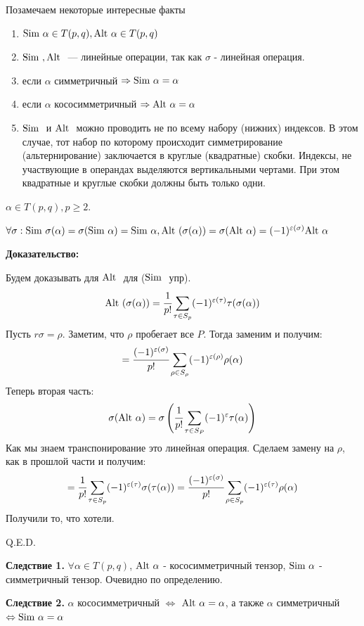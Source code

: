 Позамечаем некоторые интересные факты 
\begin{enumerate}
    \item $\text{Sim } \alpha \in T(p,q), \text{Alt } \alpha \in T(p,q) $ 
    \item $\text{Sim }, \text{Alt }$ --- линейные операции, так как $\sigma$ - линейная операция.
    \item если $\alpha$ симметричный $\Rightarrow \text{Sim } \alpha = \alpha$
    \item  если $\alpha$ кососимметричный $\Rightarrow \text{Alt } \alpha = \alpha$
    \item $\text{Sim }$ и $\text{Alt }$ можно проводить не по всему набору (нижних) индексов. В этом случае, тот набор по которому происходит симметрирование (альтернирование) заключается в круглые (квадратные) скобки. Индексы, не участвующие в операндах выделяются вертикальными чертами. При этом квадратные и круглые скобки должны быть только одни.

\end{enumerate}


$\alpha \in T(p,q), p \geq 2.$ 

$\forall \sigma: \text{Sim } \sigma(\alpha) = \sigma(\text{Sim } \alpha) = \text{Sim } \alpha, \text{Alt }(\sigma(\alpha)) = \sigma(\text{Alt }\alpha) = (-1)^{\varepsilon(\sigma)}\text{Alt } \alpha$

\textbf{Доказательство:}

Будем доказывать для $\text{Alt }$ для ($\text{Sim }$ упр).
$$\text{Alt } (\sigma(\alpha))=\cfrac{1}{p!}\sum\limits_{\tau\in S_p}(-1)^{\varepsilon(\tau)}\tau(\sigma(\alpha))$$
Пусть $r \sigma = \rho$. Заметим, что $\rho$ пробегает все $P$. Тогда заменим и получим:
$$=  \cfrac{(-1)^{\varepsilon(\sigma)}}{p!}\sum\limits_{\rho \in S_\rho} (-1)^{\varepsilon(\rho)}\rho(\alpha)$$
Теперь вторая часть:
$$\sigma(\text{Alt } \alpha) = \sigma\left(\cfrac{1}{p!}\sum_{\tau\in S_P}(-1)^{\varepsilon}\tau(\alpha)\right)$$
Как мы знаем транспонирование это линейная операция. Сделаем замену на $\rho$, как в прошлой части и получим:
$$= \cfrac{1}{p!}\sum\limits_{\tau \in S_p}(-1)^{\varepsilon(\tau)}\sigma(\tau(\alpha)) = \cfrac{(-1)^{\varepsilon(\sigma)}}{p!}\sum\limits_{\rho \in S_p}(-1)^{\varepsilon(\tau)} \rho(\alpha)$$
Получили то, что хотели.

\hfill Q.E.D.

\textbf{Следствие 1.} $\forall \alpha \in T(p,q)$, $\text{Alt } \alpha$ - кососимметричный тензор, $\text{Sim } \alpha$ - симметричный тензор. Очевидно по определению.

\textbf{Следствие 2.} $\alpha$ кососимметричный $\Leftrightarrow$ $\text{Alt } \alpha= \alpha$, а также $\alpha$ симметричный $\Leftrightarrow \text{Sim } \alpha = \alpha$

